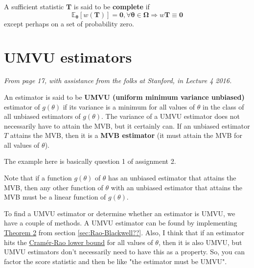 \begin{definition}\label{defn:complete}
    A sufficient statistic \(\bm{T}\) is said to be \textbf{complete} if 
    \begin{equation}\label{eq:complete premise}
        \mathbb{E}_{\bm{\theta}}[w(\bm{T})] = \bm{0}, \forall \bm{\theta} \in \bm{\Omega} \Rightarrow w{\bm{T}} \equiv \bm{0}
    \end{equation}
    except perhaps on a set of probability zero. 
\end{definition}



\section{UMVU estimators}\label{sec:UMVU ests}

\textit{From page 17, with assistance from the folks at Stanford, \autocite{stanford} in Lecture 4 2016.}

An estimator is said to be \textbf{UMVU (uniform minimum variance unbiased)} estimator of \(g(\theta)\) if its variance is a minimum for all values of \(\theta\) in the class of all unbiased estimators of \(g(\theta)\). 
The variance of a UMVU estimator does not necessarily have to attain the MVB, but it certainly can.
If an unbiased estimator \(T\) attains the MVB, then it is a \textbf{MVB estimator} (it must attain the MVB for all values of \(\theta\)). 

\begin{example}
    The example here is basically question 1 of assignment 2.
\end{example}

Note that if a function \(g(\theta)\) of \(\theta\) has an unbiased estimator that attains the MVB, then any other function of \(\theta\) with an unbiased estimator that attains the MVB must be a linear function of \(g(\theta)\). 

\bigskip

To find a UMVU estimator or determine whether an estimator is UMVU, we have a couple of methods. 
A UMVU estimator can be found by implementing \hyperref[thm:thm 2 UMVU]{Theorem 2} from section \ref{sec:Rao-Blackwell??}. 
Also, I think that if an estimator hits the  \hyperref[defn:cramer]{Cram\'{e}r-Rao lower bound} for all values of \(\theta\), then it is also UMVU, but UMVU estimators don't necessarily need to have this as a property. 
So, you can factor the score statistic and then be like "the estimator must be UMVU". 

